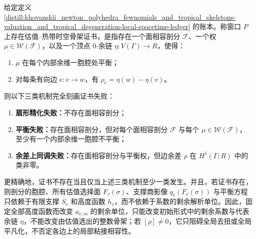 \begin{theorem}\label{distill:khovanskii_newton_polyhedra_fewnomials_and_tropical_skeletons-valuation_and_tropical_degeneration-fan-balance-residual-trichotomy}
给定定义 \ref{distill:khovanskii_newton_polyhedra_fewnomials_and_tropical_skeletons-valuation_and_tropical_degeneration-local-spacetime-ledger} 的账本。称窗口 \(P\) 上存在估值--热带时空骨架证书，是指存在一个面相容剖分 \(\mathcal F\)、一个权 \(\mu\in\mathcal W(\mathcal F)\)，以及一个顶点 \(0\)-余链 \(\eta:V(\Gamma)\to R\)，使得：
\begin{enumerate}
  \item \(\mu\) 在每个内部余维一胞腔处平衡；
  \item 对每条有向边 \(e:v\to w\)，有 \(\rho_e=\eta(w)-\eta(v)\)。
\end{enumerate}
则以下三类机制完全刻画证书失败：
\begin{enumerate}
  \item \textbf{扇形精化失败：}不存在面相容剖分；
  \item \textbf{平衡失败：}存在面相容剖分，但对每个面相容剖分 \(\mathcal F\) 与每个 \(\mu\in\mathcal W(\mathcal F)\)，至少有一个内部余维一胞腔不平衡；
  \item \textbf{余差上同调失败：}存在面相容剖分与平衡权，但边余差 \(\rho\) 在 \(H^1(\Gamma;R)\) 中的类非零。
\end{enumerate}
更精确地，证书不存在当且仅当上述三类机制至少一类发生。并且，若证书存在，则剖分的胞腔、所有估值选择面 \(F_v(\sigma)\)、支撑商影像 \(q_e(F_v(\sigma))\) 与平衡方程只依赖于有限支撑 \(S_v\) 和高度函数 \(h_v\)，而不依赖于系数的剩余解析单位。因此，固定全部高度函数而改变 \(a_{v,m}\) 的剩余单位，只能改变初始形式中的剩余系数与代表余链 \(\eta\)，不能改变由估值选出的整数骨架；若 \([\rho]\ne0\)，它只阻碍全局去扭或全局平凡化，不否定各边上的局部粘接相容性。
\end{theorem}
